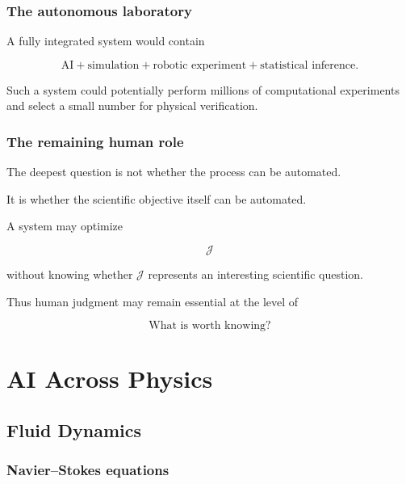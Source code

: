 \documentclass[11pt,a4paper,oneside]{book}
\begin{document}
\section{The autonomous laboratory}

A fully integrated system would contain

\begin{equation}
\text{AI}
+
\text{simulation}
+
\text{robotic experiment}
+
\text{statistical inference}.
\end{equation}

Such a system could potentially perform millions of computational experiments
and select a small number for physical verification.

\section{The remaining human role}

The deepest question is not whether the process can be automated.

It is whether the scientific objective itself can be automated.

A system may optimize

\begin{equation}
\mathcal{J}
\end{equation}

without knowing whether $\mathcal{J}$ represents an interesting scientific
question.

Thus human judgment may remain essential at the level of

\begin{equation}
\boxed{
\text{What is worth knowing?}
}
\end{equation}

\part{AI Across Physics}

\chapter{Fluid Dynamics}

\section{Navier--Stokes equations}
\end{document}
